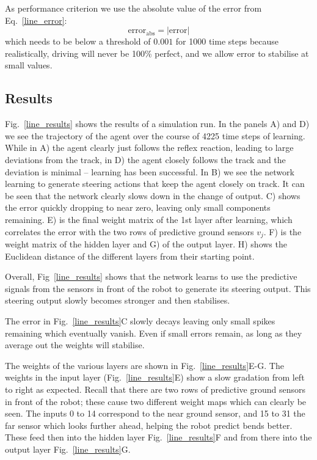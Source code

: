 \documentclass[Afour,sageh,times]{sagej}
\begin{document}
As performance criterion we use the absolute value of the error from
Eq.~\ref{line_error}:
\begin{equation}
  \mathrm{error}_\mathrm{abs} =  |\mathrm{error}| \label{line_abserr}
\end{equation}
which needs to be below a threshold of $0.001$ for 1000 time steps
because realistically, driving will never be 100\% perfect, and we
allow $\mathrm{error}$ to stabilise at small values.


\subsection{Results}
Fig.~\ref{line_results} shows the results of a simulation run. In the
panels A) and D) we see the trajectory of the agent over the course of
4225 time steps of learning. While in A) the agent clearly just
follows the reflex reaction, leading to large deviations from the
track, in D) the agent closely follows the track and the deviation is
minimal -- learning has been successful. In B) we see the network
learning to generate steering actions that keep the agent closely on track.
It can be seen that the network clearly slows down in the change of
output.  C) shows the error quickly dropping to near zero, leaving
only small components remaining. E) is the final weight matrix of the
1st layer after learning, which correlates the error with the two rows
of predictive ground sensors $v_j$. F) is the weight matrix of the
hidden layer and G) of the output layer. H) shows the Euclidean
distance of the different layers from their starting point.

Overall, Fig~\ref{line_results} shows that the network learns to use
the predictive signals from the sensors in front of the robot to
generate its steering output. This steering output slowly becomes
stronger and then stabilises.

The error in Fig.~\ref{line_results}C slowly decays
leaving only small spikes remaining which eventually vanish. Even
if small errors remain, as long as they average out the weights
will stabilise.

The weights of the various layers are shown in
Fig.~\ref{line_results}E-G. The weights in the input layer
(Fig.~\ref{line_results}E) show a slow gradation from left to right as
expected. Recall that there are two rows of predictive ground
sensors in front of the robot; these cause two different weight maps
which can clearly be seen. The inputs 0 to 14 correspond to the near
ground sensor, and 15 to 31 the far sensor which looks further ahead, 
helping the robot predict bends better. These feed then into the 
hidden layer Fig.~\ref{line_results}F
and from there into the output layer Fig.~\ref{line_results}G.
\end{document}
